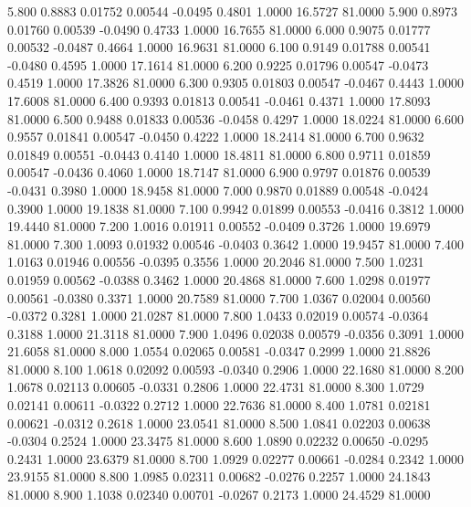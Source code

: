    5.800   0.8883   0.01752   0.00544  -0.0495   0.4801   1.0000  16.5727  81.0000
   5.900   0.8973   0.01760   0.00539  -0.0490   0.4733   1.0000  16.7655  81.0000
   6.000   0.9075   0.01777   0.00532  -0.0487   0.4664   1.0000  16.9631  81.0000
   6.100   0.9149   0.01788   0.00541  -0.0480   0.4595   1.0000  17.1614  81.0000
   6.200   0.9225   0.01796   0.00547  -0.0473   0.4519   1.0000  17.3826  81.0000
   6.300   0.9305   0.01803   0.00547  -0.0467   0.4443   1.0000  17.6008  81.0000
   6.400   0.9393   0.01813   0.00541  -0.0461   0.4371   1.0000  17.8093  81.0000
   6.500   0.9488   0.01833   0.00536  -0.0458   0.4297   1.0000  18.0224  81.0000
   6.600   0.9557   0.01841   0.00547  -0.0450   0.4222   1.0000  18.2414  81.0000
   6.700   0.9632   0.01849   0.00551  -0.0443   0.4140   1.0000  18.4811  81.0000
   6.800   0.9711   0.01859   0.00547  -0.0436   0.4060   1.0000  18.7147  81.0000
   6.900   0.9797   0.01876   0.00539  -0.0431   0.3980   1.0000  18.9458  81.0000
   7.000   0.9870   0.01889   0.00548  -0.0424   0.3900   1.0000  19.1838  81.0000
   7.100   0.9942   0.01899   0.00553  -0.0416   0.3812   1.0000  19.4440  81.0000
   7.200   1.0016   0.01911   0.00552  -0.0409   0.3726   1.0000  19.6979  81.0000
   7.300   1.0093   0.01932   0.00546  -0.0403   0.3642   1.0000  19.9457  81.0000
   7.400   1.0163   0.01946   0.00556  -0.0395   0.3556   1.0000  20.2046  81.0000
   7.500   1.0231   0.01959   0.00562  -0.0388   0.3462   1.0000  20.4868  81.0000
   7.600   1.0298   0.01977   0.00561  -0.0380   0.3371   1.0000  20.7589  81.0000
   7.700   1.0367   0.02004   0.00560  -0.0372   0.3281   1.0000  21.0287  81.0000
   7.800   1.0433   0.02019   0.00574  -0.0364   0.3188   1.0000  21.3118  81.0000
   7.900   1.0496   0.02038   0.00579  -0.0356   0.3091   1.0000  21.6058  81.0000
   8.000   1.0554   0.02065   0.00581  -0.0347   0.2999   1.0000  21.8826  81.0000
   8.100   1.0618   0.02092   0.00593  -0.0340   0.2906   1.0000  22.1680  81.0000
   8.200   1.0678   0.02113   0.00605  -0.0331   0.2806   1.0000  22.4731  81.0000
   8.300   1.0729   0.02141   0.00611  -0.0322   0.2712   1.0000  22.7636  81.0000
   8.400   1.0781   0.02181   0.00621  -0.0312   0.2618   1.0000  23.0541  81.0000
   8.500   1.0841   0.02203   0.00638  -0.0304   0.2524   1.0000  23.3475  81.0000
   8.600   1.0890   0.02232   0.00650  -0.0295   0.2431   1.0000  23.6379  81.0000
   8.700   1.0929   0.02277   0.00661  -0.0284   0.2342   1.0000  23.9155  81.0000
   8.800   1.0985   0.02311   0.00682  -0.0276   0.2257   1.0000  24.1843  81.0000
   8.900   1.1038   0.02340   0.00701  -0.0267   0.2173   1.0000  24.4529  81.0000
